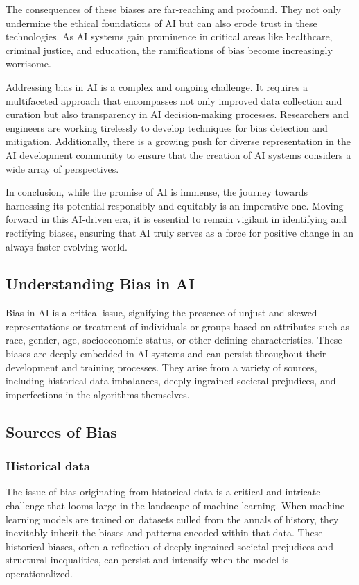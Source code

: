 \documentclass[12pt,a4paper,openright,twoside]{book}
\begin{document}
The consequences of these biases are far-reaching and profound. They not only undermine the ethical foundations of AI but can also erode trust in these technologies. As AI systems gain prominence in critical areas like healthcare, criminal justice, and education, the ramifications of bias become increasingly worrisome. 

Addressing bias in AI is a complex and ongoing challenge. It requires a multifaceted approach that encompasses not only improved data collection and curation but also transparency in AI decision-making processes. Researchers and engineers are working tirelessly to develop techniques for bias detection and mitigation. Additionally, there is a growing push for diverse representation in the AI development community to ensure that the creation of AI systems considers a wide array of perspectives. 

In conclusion, while the promise of AI is immense, the journey towards harnessing its potential responsibly and equitably is an imperative one. Moving forward in this AI-driven era, it is essential to remain vigilant in identifying and rectifying biases, ensuring that AI truly serves as a force for positive change in an always faster evolving world. \cite{10.1145/3308560.3317590}

\subsection{Understanding Bias in AI}

Bias in AI is a critical issue, signifying the presence of unjust and skewed representations or treatment of individuals or groups based on attributes such as race, gender, age, socioeconomic status, or other defining characteristics. These biases are deeply embedded in AI systems and can persist throughout their development and training processes. They arise from a variety of sources, including historical data imbalances, deeply ingrained societal prejudices, and imperfections in the algorithms themselves.

\subsection{Sources of Bias}

\subsubsection{Historical data} 

The issue of bias originating from historical data is a critical and intricate challenge that looms large in the landscape of machine learning. When machine learning models are trained on datasets culled from the annals of history, they inevitably inherit the biases and patterns encoded within that data. These historical biases, often a reflection of deeply ingrained societal prejudices and structural inequalities, can persist and intensify when the model is operationalized. \cite{10.1145/3308560.3317590}
\end{document}
